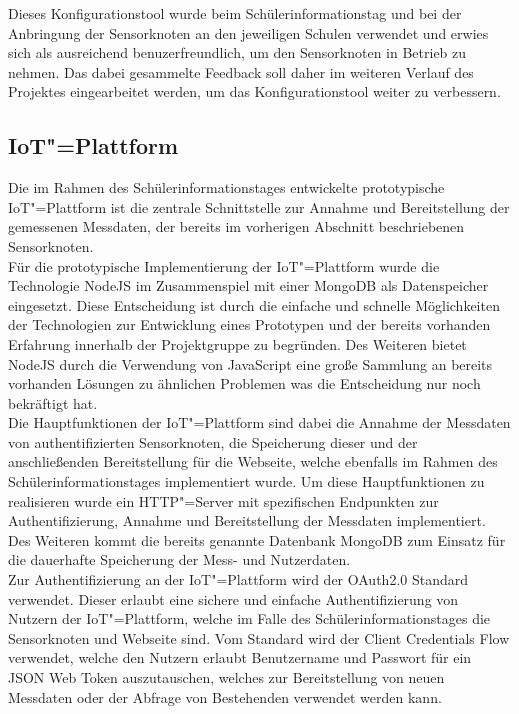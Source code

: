 Dieses Konfigurationstool wurde beim Schülerinformationstag und bei der Anbringung der Sensorknoten an den jeweiligen Schulen verwendet und erwies sich als ausreichend benuzerfreundlich, um den Sensorknoten in Betrieb zu nehmen.
Das dabei gesammelte Feedback soll daher im weiteren Verlauf des Projektes eingearbeitet werden, um das Konfigurationstool weiter zu verbessern.

\subsection{IoT"=Plattform}
Die im Rahmen des Schülerinformationstages entwickelte prototypische IoT"=Plattform ist die zentrale Schnittstelle zur Annahme und Bereitstellung der gemessenen Messdaten, der bereits im vorherigen Abschnitt beschriebenen Sensorknoten. \\
Für die prototypische Implementierung der IoT"=Plattform wurde die Technologie NodeJS im Zusammenspiel mit einer MongoDB als Datenspeicher eingesetzt.
Diese Entscheidung ist durch die einfache und schnelle Möglichkeiten der Technologien zur Entwicklung eines Prototypen und der bereits vorhanden Erfahrung innerhalb der Projektgruppe zu begründen.
Des Weiteren bietet NodeJS durch die Verwendung von JavaScript eine große Sammlung an bereits vorhanden Lösungen zu ähnlichen Problemen was die Entscheidung nur noch bekräftigt hat. \\
Die Hauptfunktionen der IoT"=Plattform sind dabei die Annahme der Messdaten von authentifizierten Sensorknoten, die Speicherung dieser und der anschließenden Bereitstellung für die Webseite, welche ebenfalls im Rahmen des Schülerinformationstages implementiert wurde.
Um diese Hauptfunktionen zu realisieren wurde ein HTTP"=Server mit spezifischen Endpunkten zur Authentifizierung, Annahme und Bereitstellung der Messdaten implementiert.
Des Weiteren kommt die bereits genannte Datenbank MongoDB zum Einsatz für die dauerhafte Speicherung der Mess- und Nutzerdaten. \\
Zur Authentifizierung an der IoT"=Plattform wird der OAuth2.0 Standard verwendet.
Dieser erlaubt eine sichere und einfache Authentifizierung von Nutzern der IoT"=Plattform, welche im Falle des Schülerinformationstages die Sensorknoten und Webseite sind.
Vom Standard wird der Client Credentials Flow verwendet, welche den Nutzern erlaubt Benutzername und Passwort für ein JSON Web Token auszutauschen, welches zur Bereitstellung von neuen Messdaten oder der Abfrage von Bestehenden verwendet werden kann. \\
